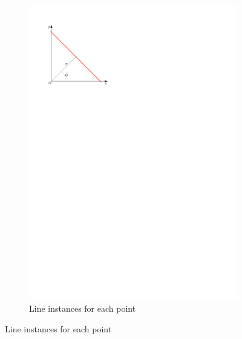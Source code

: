 \begin{figure}[htb]
\begin{subfigure}[b]{0.3\linewidth}
		\includegraphics[width=\textwidth,page=3]{figs/hough-transform.pdf}
		\caption{Line instances for each point}
		\label{fig:hough-transform:c}
	\end{subfigure}
	

\end{figure}
